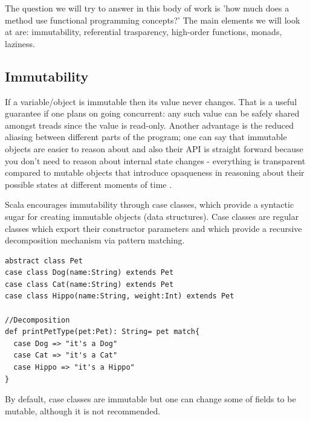 \documentclass{article}
\begin{document}
The question we will try to answer in this body of work is 'how much does a method use functional programming concepts?' The main elements we will look at are: immutability, referential trasparency, high-order functions, monads, laziness.


\subsection {Immutability}
If a variable/object is immutable then its value never changes. That is a useful guarantee if one plans on going concurrent: any such value can be safely shared amongst treads since the value is read-only. Another advantage is the reduced aliasing between different parts of the program; one can say that immutable objects are easier to reason about and also their API is straight forward because you don't need to reason about internal state changes - everything is transparent compared to mutable objects that introduce opaqueness in reasoning about their possible states at different moments of time . \par
Scala encourages immutability through case classes, which provide a syntactic sugar for creating immutable objects (data structures). Case classes are regular classes which export their constructor parameters and which provide a recursive decomposition mechanism via pattern matching.

\begin{lstlisting} 
abstract class Pet
case class Dog(name:String) extends Pet 
case class Cat(name:String) extends Pet
case class Hippo(name:String, weight:Int) extends Pet

//Decomposition
def printPetType(pet:Pet): String= pet match{
  case Dog => "it's a Dog"
  case Cat => "it's a Cat"
  case Hippo => "it's a Hippo"
}
\end{lstlisting}

By default, case classes are immutable but one can change some of fields to be mutable, although it is not recommended.\par
\end{document}
